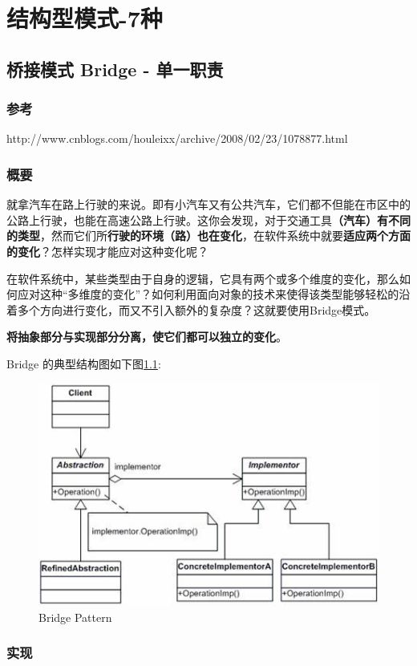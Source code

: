 \documentclass[UTF8,a4paper,12pt]{ctexbook}
\begin{document}
\chapter{结构型模式-7种}
\section{桥接模式 Bridge - 单一职责}	
	\subsection{参考}
		http://www.cnblogs.com/houleixx/archive/2008/02/23/1078877.html	
	
	\subsection{概要}
		就拿汽车在路上行驶的来说。即有小汽车又有公共汽车，它们都不但能在市区中的公路上行驶，也能在高速公路上行驶。这你会发现，对于交通工具\textbf{（汽车）有不同的类型}，然而它们所\textbf{行驶的环境（路）也在变化}，在软件系统中就要\textbf{适应两个方面的变化}？怎样实现才能应对这种变化呢？
		
		在软件系统中，某些类型由于自身的逻辑，它具有两个或多个维度的变化，那么如何应对这种“多维度的变化”？如何利用面向对象的技术来使得该类型能够轻松的沿着多个方向进行变化，而又不引入额外的复杂度？这就要使用Bridge模式。
		
		\textbf{将抽象部分与实现部分分离，使它们都可以独立的变化}。
		
		Bridge 的典型结构图如下图\ref{Bridge}:
		\begin{figure}[h]
			\centering
			\includegraphics[scale= 0.8]{bridge.jpg}
			\caption{Bridge Pattern}
			\label{Bridge}
		\end{figure}
		
	
	\subsection{实现}	
\end{document}
